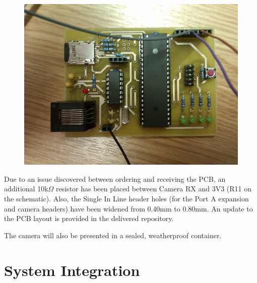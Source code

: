 \begin{figure}[H]
        \centering
        \includegraphics[width=1.00\textwidth]{figures/PayloadImplementation.jpg}
        \label{fig:PayloadImplementation}
\end{figure}

Due to an issue discovered between ordering and receiving the PCB, an 
additional 10k$\Omega$ resistor has been placed between Camera RX and 3V3 (R11 
on the schematic). Also, the Single In Line header holes (for the Port A 
expansion and camera headers) have been widened from 0.40mm to 0.80mm. An 
update to the PCB layout is provided in the delivered repository.

The camera will also be presented in a sealed, weatherproof container.

\section{System Integration}

